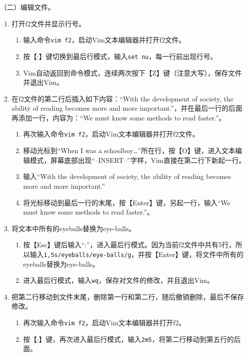 \vspace{0.1in}
（二）编辑文件。
\begin{enumerate}
  \item 打开f2文件并显示行号。
    \begin{enumerate}
      \item 输入命令\verb|vim f2|，启动Vim文本编辑器并打开f2文件。
      \item 按【:】键切换到最后行模式，输入\verb|set nu|，每一行前出现行号。
      \item Vim自动返回到命令模式，连续两次按下【Z】键（注意大写），保存文件并退出Vim。
    \end{enumerate}
  \item 在f2文件的第二行后插入如下内容：“With the development of society, the ability of reading becomes more and more important.”，并在最后一行的后面再添加一行，内容为：“We must know some methods to read faster.”。
    \begin{enumerate}
      \item 再次输入命令\verb|vim f2|，启动Vim文本编辑器并打开f2文件。
      \item 移动光标到“When I was a schoolboy…”所在行，按【O】键，进入文本编辑模式，屏幕底部出现“--INSERT--”字样，Vim直接在第二行下新起一行。
      \item 输入“With the development of society, the ability of reading becomes more and more important.”
      \item 将光标移动到最后一行的末尾，按【Enter】键，另起一行，输入“We must know some methods to read faster.”。
    \end{enumerate}
  \item 将文本中所有的eyeballs替换为eye-balls。
    \begin{enumerate}
      \item
	按【Esc】键后输入“:”，进入最后行模式。因为当前f2文件中共有5行，所以输入\verb|1,5s/eyeballs/eye-balls/g|，并按【Enter】键，将文件中所有的eyeballs替换为eye-balls。
      \item 进入最后行模式，输入\verb|wq|，保存对文件的修改，并且退出Vim。
    \end{enumerate}
  \item 把第二行移动到文件末尾，删除第一行和第二行，随后撤销删除，最后不保存修改。
    \begin{enumerate}
      \item 再次输入命令\verb|vim f2|，启动Vim文本编辑器并打开f2。
      \item 按【:】键，再次进入最后行模式，输入\verb|2m5|，将第二行移动到第五行的后面。

\end{enumerate}
\end{enumerate}
